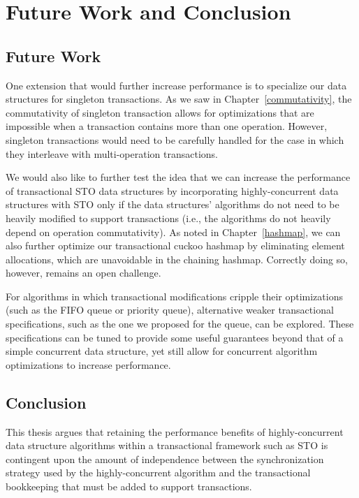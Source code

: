 \chapter{Future Work and Conclusion}

\section{Future Work}
One extension that would further increase performance is to specialize our data structures for singleton transactions. As we saw in Chapter~\ref{commutativity}, the commutativity of singleton transaction allows for optimizations that are impossible when a transaction contains more than one operation. However, singleton transactions would need to be carefully handled for the case in which they interleave with multi-operation transactions. 

We would also like to further test the idea that we can increase the performance of transactional STO data structures by incorporating highly-concurrent data structures with STO only if the data structures' algorithms do not need to be heavily modified to support transactions (i.e., the algorithms do not heavily depend on operation commutativity).
As noted in Chapter~\ref{hashmap}, we can also further optimize our transactional cuckoo hashmap by eliminating element allocations, which are unavoidable in the chaining hashmap. Correctly doing so, however, remains an open challenge.

For algorithms in which transactional modifications cripple their optimizations (such as the FIFO queue or priority queue), alternative weaker transactional specifications, such as the one we proposed for the queue, can be explored. These specifications can be tuned to provide some useful guarantees beyond that of a simple concurrent data structure, yet still allow for concurrent algorithm optimizations to increase performance.

\section{Conclusion}
This thesis argues that retaining the performance benefits of highly-concurrent data structure algorithms within a transactional framework such as STO is contingent upon the amount of independence between the synchronization strategy used by the highly-concurrent algorithm and the transactional bookkeeping that must be added to support transactions.

